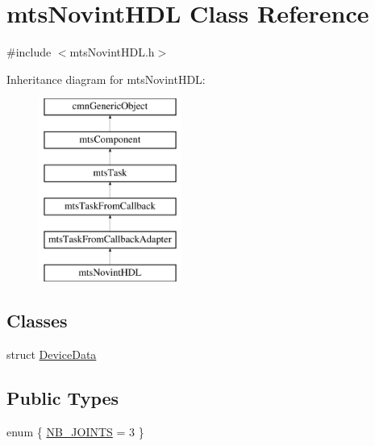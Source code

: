 \hypertarget{classmts_novint_h_d_l}{}\section{mts\+Novint\+H\+D\+L Class Reference}
\label{classmts_novint_h_d_l}


{\ttfamily \#include $<$mts\+Novint\+H\+D\+L.\+h$>$}

Inheritance diagram for mts\+Novint\+H\+D\+L\+:\begin{figure}[H]
\begin{center}
\leavevmode
\includegraphics[height=6.000000cm]{d4/d52/classmts_novint_h_d_l}
\end{center}
\end{figure}
\subsection*{Classes}
\begin{DoxyCompactItemize}
\item 
struct \hyperlink{structmts_novint_h_d_l_1_1_device_data}{Device\+Data}
\end{DoxyCompactItemize}
\subsection*{Public Types}
\begin{DoxyCompactItemize}
\item 
enum \{ \hyperlink{classmts_novint_h_d_l_a7b20d42ecde7a76354bf6a930c37fe3dac8cb22af32b40caa61bd313eafc3d9f0}{N\+B\+\_\+\+J\+O\+I\+N\+T\+S} = 3
 \}
\end{DoxyCompactItemize}

